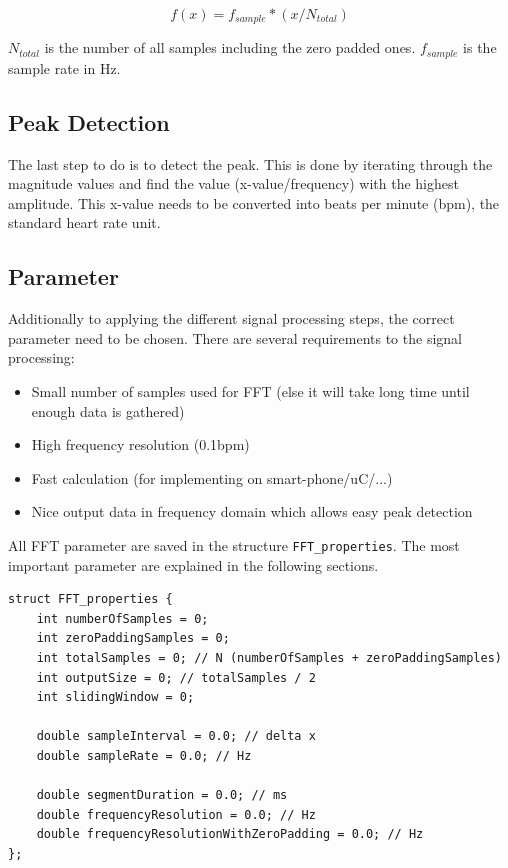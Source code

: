 \documentclass[notitlepage]{scrreprt}
\begin{document}
\begin{equation}
f(x) = f_{sample} * (x / N_{total})
\end{equation}

$N_{total}$ is the number of all samples including the zero padded ones. $f_{sample}$ is the sample rate in Hz.

\subsection{Peak Detection}
The last step to do is to detect the peak. This is done by iterating through the magnitude values and find the value (x-value/frequency) with the highest amplitude. This x-value needs to be converted into beats per minute (bpm), the standard heart rate unit.

\subsection{Parameter}
Additionally to applying the different signal processing steps, the correct parameter need to be chosen. There are several requirements to the signal processing:

\begin{itemize}
	\item{Small number of samples used for FFT (else it will take long time until enough data is gathered)}
	\item{High frequency resolution (0.1bpm)}
	\item{Fast calculation (for implementing on smart-phone/uC/...)}
	\item{Nice output data in frequency domain which allows easy peak detection}\\
\end{itemize}

All FFT parameter are saved in the structure \lstinline{FFT_properties}. The most important parameter are explained in the following sections.

\begin{lstlisting}
struct FFT_properties {
    int numberOfSamples = 0;
    int zeroPaddingSamples = 0;
    int totalSamples = 0; // N (numberOfSamples + zeroPaddingSamples)
    int outputSize = 0; // totalSamples / 2
    int slidingWindow = 0;

    double sampleInterval = 0.0; // delta x
    double sampleRate = 0.0; // Hz

    double segmentDuration = 0.0; // ms
    double frequencyResolution = 0.0; // Hz
    double frequencyResolutionWithZeroPadding = 0.0; // Hz
};
\end{lstlisting}
\end{document}
